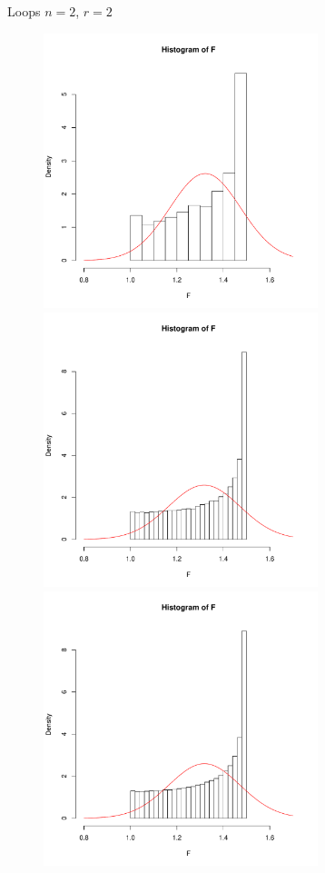 \documentclass{beamer}
\begin{document}
\begin{frame}{Loops}
$n=2$, $r=2$\\
\begin{figure}

\begin{overprint}
\centerline{\includegraphics[width=8cm]{Primer_1e+3.pdf}}
\centerline{\includegraphics[width=8cm]{Primer_1e+5.pdf}}
\centerline{\includegraphics[width=8cm]{Primer_1e+6.pdf}}

\end{overprint}
\end{figure}
\end{frame}
\end{document}
